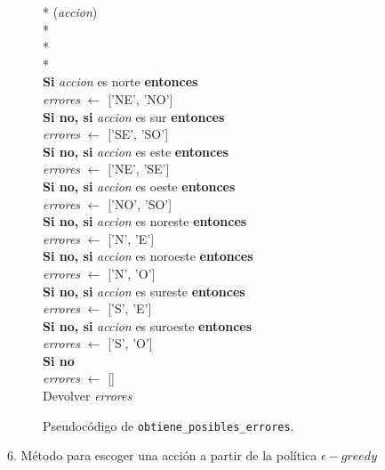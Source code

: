 \documentclass[conference,a4paper]{IEEEtran}
\begin{document}
\begin{figure}[h]
  \begin{pseudo}*
    (\textit{accion}) \\*
     \\*
     \\*
    \\
    \textbf{Si} \textit{accion} es norte \textbf{entonces} \\
    \> \textit{errores} $\leftarrow$ ['NE', 'NO'] \\
    \textbf{Si no, si} \textit{accion} es sur \textbf{entonces} \\
    \> \textit{errores} $\leftarrow$ ['SE', 'SO'] \\
    \textbf{Si no, si} \textit{accion} es este \textbf{entonces} \\
    \> \textit{errores} $\leftarrow$ ['NE', 'SE'] \\
    \textbf{Si no, si} \textit{accion} es oeste \textbf{entonces} \\
    \> \textit{errores} $\leftarrow$ ['NO', 'SO'] \\
    \textbf{Si no, si} \textit{accion} es noreste \textbf{entonces} \\
    \> \textit{errores} $\leftarrow$ ['N', 'E'] \\
    \textbf{Si no, si} \textit{accion} es noroeste \textbf{entonces} \\
    \> \textit{errores} $\leftarrow$ ['N', 'O'] \\
    \textbf{Si no, si} \textit{accion} es sureste \textbf{entonces} \\
    \> \textit{errores} $\leftarrow$ ['S', 'E'] \\
    \textbf{Si no, si} \textit{accion} es suroeste \textbf{entonces} \\
    \> \textit{errores} $\leftarrow$ ['S', 'O'] \\
    \textbf{Si no} \\
    \> \textit{errores} $\leftarrow$ [] \\
    Devolver \textit{errores}
  \end{pseudo}
  \caption{Pseudocódigo de \texttt{obtiene\_posibles\_errores}.}
  \label{fig:obtiene_posibles_errores}
\end{figure}


6. Método para escoger una acción a partir de la política \(\epsilon-greedy\)\
  
\end{document}
